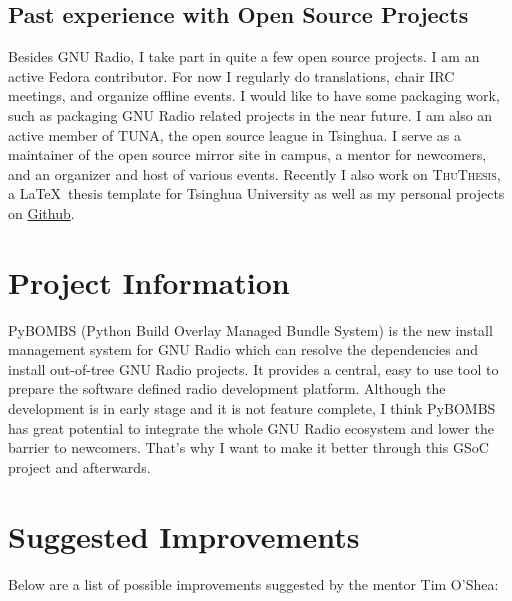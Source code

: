 \documentclass[a4paper]{article}
\begin{document}
\subsection{Past experience with Open Source Projects}

Besides GNU Radio, I take part in quite a few open source projects.  I
am an active Fedora contributor. For now I regularly do translations,
chair IRC meetings, and organize offline events.  I would like to have
some packaging work, such as packaging GNU Radio related projects in the
near future. I am also an active member of TUNA, the open source league
in Tsinghua. I serve as a maintainer of the open source mirror site in
campus, a mentor for newcomers, and an organizer and host of various
events. Recently I also work on \textsc{ThuThesis}, a \LaTeX\ thesis template
for Tsinghua University as well as my personal projects on
\href{https://github.com/alick9188}{Github}.

\section{Project Information}

PyBOMBS (Python Build Overlay Managed Bundle System) is the new install
management system for GNU Radio which can resolve the dependencies and
install out-of-tree GNU Radio projects. It provides a central, easy to
use tool to prepare the software defined radio development platform.
Although the development is in early stage and it is not feature
complete, I think PyBOMBS has great potential to integrate the whole GNU
Radio ecosystem and lower the barrier to newcomers. That's why I want to
make it better through this GSoC project and afterwards.

\section{Suggested Improvements}

Below are a list of possible improvements suggested by the mentor Tim O'Shea:
\end{document}
